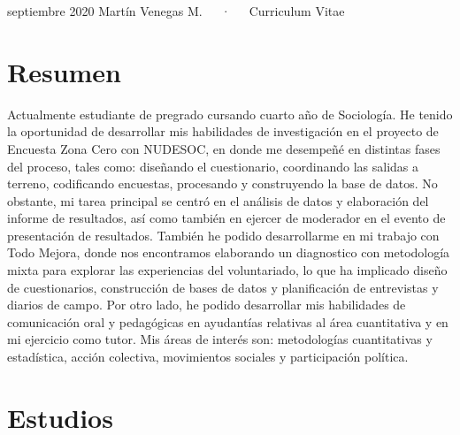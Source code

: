 \documentclass[11pt, a4paper]{awesome-cv}
\begin{document}
\makecvheader

\makecvfooter
  {septiembre 2020}
    {Martín Venegas M.~~~·~~~Curriculum Vitae}
  {\thepage}





\hypertarget{resumen}{%
\section{Resumen}\label{resumen}}

Actualmente estudiante de pregrado cursando cuarto año de Sociología. He tenido la oportunidad de desarrollar mis habilidades de investigación en el proyecto de Encuesta Zona Cero con NUDESOC, en donde me desempeñé en distintas fases del proceso, tales como: diseñando el cuestionario, coordinando las salidas a terreno, codificando encuestas, procesando y construyendo la base de datos. No obstante, mi tarea principal se centró en el análisis de datos y elaboración del informe de resultados, así como también en ejercer de moderador en el evento de presentación de resultados. También he podido desarrollarme en mi trabajo con Todo Mejora, donde nos encontramos elaborando un diagnostico con metodología mixta para explorar las experiencias del voluntariado, lo que ha implicado diseño de cuestionarios, construcción de bases de datos y planificación de entrevistas y diarios de campo. Por otro lado, he podido desarrollar mis habilidades de comunicación oral y pedagógicas en ayudantías relativas al área cuantitativa y en mi ejercicio como tutor. Mis áreas de interés son: metodologías cuantitativas y estadística, acción colectiva, movimientos sociales y participación política.

\hypertarget{estudios}{%
\section{Estudios}\label{estudios}}
\end{document}
